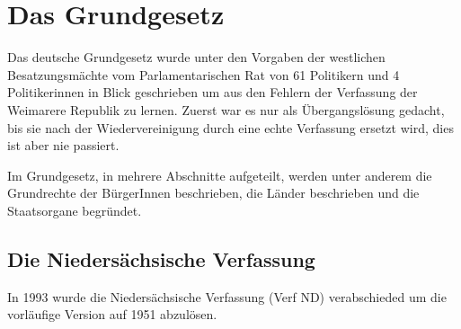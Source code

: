 \documentclass{article}
\begin{document}
\section{Das Grundgesetz} 
Das deutsche Grundgesetz wurde unter den Vorgaben der westlichen Besatzungsmächte vom Parlamentarischen Rat von 61 Politikern und 4 Politikerinnen in Blick geschrieben um aus den Fehlern der Verfassung der Weimarere Republik zu lernen. Zuerst war es nur als Übergangslösung gedacht, bis sie nach der Wiedervereinigung durch eine echte Verfassung ersetzt wird, dies ist aber nie passiert.

Im Grundgesetz, in mehrere Abschnitte aufgeteilt, werden unter anderem die Grundrechte der BürgerInnen beschrieben, die Länder beschrieben und die Staatsorgane begründet.

\subsection{Die Niedersächsische Verfassung}
In 1993 wurde die Niedersächsische Verfassung (Verf ND) verabschieded um die vorläufige Version auf 1951 abzulösen.
\end{document}
